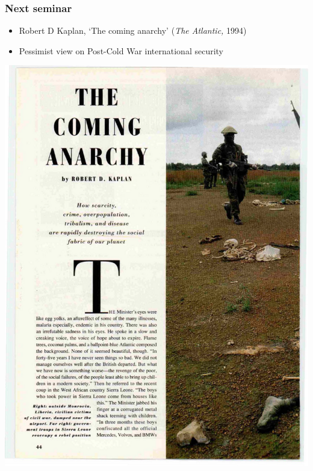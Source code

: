 \documentclass[aspectratio=43]{beamer}
\begin{document}
\begin{frame}
\frametitle{Next seminar}
\centering

\begin{minipage}{0.55\textwidth}\centering
\begin{itemize}
  \item Robert D Kaplan, `The coming anarchy' (\textit{The Atlantic,} 1994)
  \item Pessimist view on Post-Cold War international security
\end{itemize}
\end{minipage}\hfill
\begin{minipage}{0.44\textwidth}\centering
\includegraphics[width = \textwidth]{img/ComingAnarchy}
\end{minipage}

\end{frame}
\end{document}
